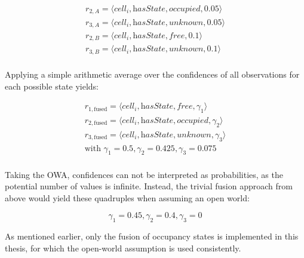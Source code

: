 \begin{gather*}
	r_{2,A} = \langle \textit{cell}_i, \textit{hasState}, \textit{occupied}, 0.05 \rangle \\
	r_{3,A} = \langle \textit{cell}_i, \textit{hasState}, \textit{unknown}, 0.05 \rangle \\
	r_{2,B} = \langle \textit{cell}_i, \textit{hasState}, \textit{free}, 0.1 \rangle \\
	r_{3,B} = \langle \textit{cell}_i, \textit{hasState}, \textit{unknown}, 0.1 \rangle \\
\end{gather*}

Applying a simple arithmetic average over the confidences of all observations for each possible state yields:

\begin{gather*}
	r_{1,\text{fused}} = \langle \textit{cell}_i, \textit{hasState}, \textit{free}, \gamma_1 \rangle \\
	r_{2,\text{fused}} = \langle \textit{cell}_i, \textit{hasState}, \textit{occupied}, \gamma_2 \rangle \\
	r_{3,\text{fused}} = \langle \textit{cell}_i, \textit{hasState}, \textit{unknown}, \gamma_3 \rangle \\
	\text{with\ } \gamma_1 = 0.5, \gamma_2 = 0.425, \gamma_3 = 0.075 \\
\end{gather*}

Taking the OWA, confidences can not be interpreted as probabilities, as the potential number of values is infinite. Instead, the trivial fusion approach from above would yield these quadruples when assuming an open world:

$$\gamma_1 = 0.45, \gamma_2 = 0.4, \gamma_3 = 0$$

As mentioned earlier, only the fusion of occupancy states is implemented in this thesis, for which the open-world assumption is used consistently.

